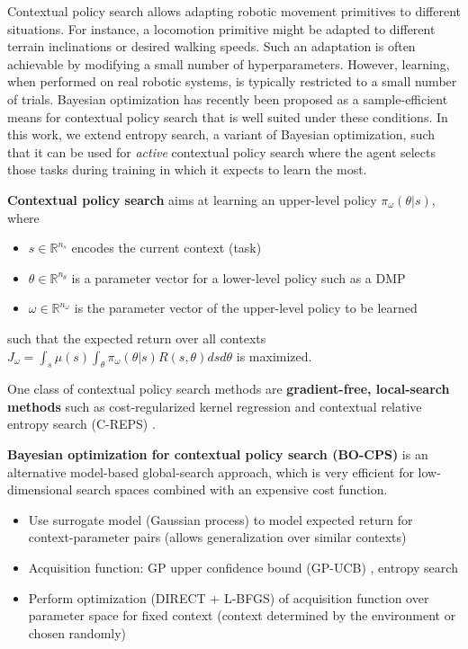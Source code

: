 

\begin{block}{}
\justifying
Contextual policy search allows adapting robotic movement primitives to
different situations. For instance, a locomotion primitive might be adapted to
different terrain inclinations or desired walking speeds. Such an adaptation
is often achievable by modifying a small number of hyperparameters.
However, learning, when performed on real robotic systems, is typically
restricted to a small number of trials. Bayesian optimization
has recently been proposed as a sample-efficient means for contextual policy search
that is well suited under these conditions.
In this work, we extend entropy search, a variant of Bayesian optimization,
such that it can be used for \emph{active} contextual policy search where the agent
selects those tasks during training in which it expects to learn the most.
\end{block}

\begin{block}{}
\textbf{Contextual policy search} \cite{deisenroth_survey_2013} aims at learning an upper-level policy $\pi_\omega(\theta \vert s)$, where
\begin{itemize}
 \item $s \in \mathbb{R}^{n_s}$ encodes the current context (task)
 \item $\theta \in \mathbb{R}^{n_\theta}$ is a parameter vector for a lower-level policy such as a DMP \cite{ijspeert_dynamical_2013}
 \item $\omega \in \mathbb{R}^{n_\omega}$ is the parameter vector of the upper-level policy to be learned
\end{itemize}
such that the expected return over all contexts $J_\omega = \int_s \mu(s) \int_\theta \pi_\omega(\theta \vert s) R(s, \theta) ds d\theta$ is maximized.

One class of contextual policy search methods are \textbf{gradient-free, local-search methods} such as cost-regularized kernel regression \cite{Kober2012} and contextual relative entropy search (C-REPS) \cite{kupcsik_data-efficient_2013}.

\textbf{Bayesian optimization for contextual policy search (BO-CPS)} \cite{metzen_bayesian_2015} is an alternative model-based global-search approach, which is very efficient for low-dimensional search spaces combined with an expensive cost function.
\begin{itemize}
 \item Use surrogate model (Gaussian process) to model expected return for context-parameter pairs (allows generalization over similar contexts)
 \item Acquisition function: GP upper confidence bound (GP-UCB) \cite{srinivas_gaussian_2010}, entropy search \cite{hennig_entropy_2012}
 \item Perform optimization (DIRECT + L-BFGS) of acquisition function over parameter space for fixed context (context determined by the environment or chosen randomly)
\end{itemize}

\end{block}

